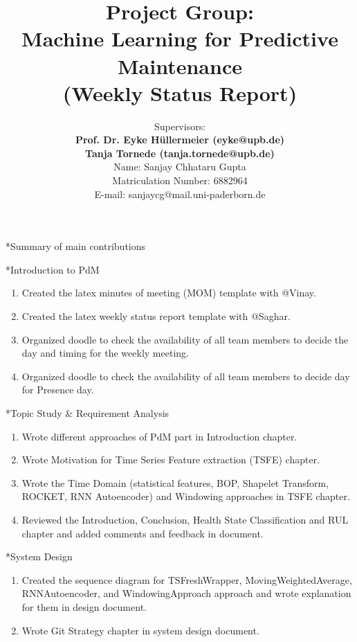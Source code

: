 \documentclass[11pt,a4paper]{article}
\title{Project Group:\\
\textbf{Machine Learning for Predictive Maintenance}\\
(Weekly Status Report)}
\author{Supervisors:\\
\textbf{Prof. Dr. Eyke H{\"u}llermeier (eyke@upb.de)}\\
\textbf{Tanja Tornede (tanja.tornede@upb.de)}\\ 
\vspace{10mm}
Name: Sanjay Chhataru Gupta \\
Matriculation Number: 6882964\\
E-mail: sanjaycg@mail.uni-paderborn.de
}
\date{}
\begin{document}
\maketitle
\thispagestyle{empty}

\clearpage
{}

\newpage
\begin{section}*{Summary of main contributions}
 \begin{subsection}*{Introduction to PdM}
     \begin{enumerate}
         \item Created the latex minutes of meeting (MOM) template with @Vinay.
         \item Created the latex weekly status report template with @Saghar.
         \item Organized doodle to check the availability of all team members to decide the day and timing for the weekly meeting.
         \item Organized doodle to check the availability of all team members to decide day for Presence day.
     \end{enumerate}
 \end{subsection}
 \begin{subsection}*{Topic Study \& Requirement Analysis}
     \begin{enumerate}
         \item Wrote different approaches of PdM part in Introduction chapter.
         \item Wrote Motivation for Time Series Feature extraction (TSFE) chapter.
         \item Wrote the Time Domain (statistical features, BOP, Shapelet Transform, ROCKET, RNN Autoencoder) and Windowing approaches in TSFE chapter.
         \item Reviewed the Introduction, Conclusion, Health State Classification and RUL chapter and added comments and feedback in document.
     \end{enumerate}
 \end{subsection}
 \begin{subsection}*{System Design}
     \begin{enumerate}
         \item Created the sequence diagram for TSFreshWrapper, MovingWeightedAverage, RNNAutoencoder, and WindowingApproach approach and wrote explanation for them in design document.
         \item Wrote Git Strategy chapter in system design document.

\end{enumerate}
\end{subsection}
\end{section}
\end{document}

